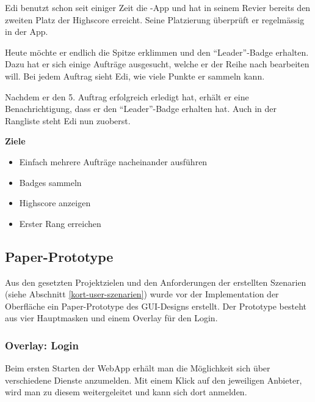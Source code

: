 Edi benutzt schon seit einiger Zeit die \kort{}-App und hat in seinem Revier bereits den zweiten Platz der Highscore erreicht.
Seine Platzierung überprüft er regelmässig in der App.

Heute möchte er endlich die Spitze erklimmen und den "`Leader"'-Badge erhalten.
Dazu hat er sich einige Aufträge ausgesucht, welche er der Reihe nach bearbeiten will.
Bei jedem Auftrag sieht Edi, wie viele Punkte er sammeln kann.

Nachdem er den 5. Auftrag erfolgreich erledigt hat, erhält er eine Benachrichtigung, dass er den "`Leader"'-Badge erhalten hat.
Auch in der Rangliste steht Edi nun zuoberst.

\textbf{Ziele}
\begin{itemize}
\item Einfach mehrere Aufträge nacheinander ausführen
\item Badges sammeln
\item Highscore anzeigen
\item Erster Rang erreichen
\end{itemize}

\subsection{Paper-Prototype}
\setcounter{subfigure}{0}

Aus den gesetzten Projektzielen und den Anforderungen der erstellten Szenarien (siehe Abschnitt \ref{kort-user-szenarien}) wurde vor der Implementation der Oberfläche ein Paper-Prototype des GUI-Designs erstellt.
Der Prototype besteht aus vier Hauptmasken und einem Overlay für den Login.

\subsubsection{Overlay: Login}
Beim ersten Starten der \gls{WebApp} erhält man die Möglichkeit sich über verschiedene Dienste anzumelden.
Mit einem Klick auf den jeweiligen Anbieter, wird man zu diesem weitergeleitet und kann sich dort anmelden.

